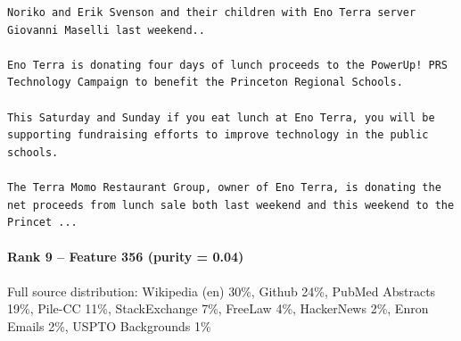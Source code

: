 \begin{verbatim}
Noriko and Erik Svenson and their children with Eno Terra server Giovanni Maselli last weekend..

Eno Terra is donating four days of lunch proceeds to the PowerUp! PRS Technology Campaign to benefit the Princeton Regional Schools.

This Saturday and Sunday if you eat lunch at Eno Terra, you will be supporting fundraising efforts to improve technology in the public schools.

The Terra Momo Restaurant Group, owner of Eno Terra, is donating the net proceeds from lunch sale both last weekend and this weekend to the Princet ...

\end{verbatim}

\paragraph*{Rank 9 -- Feature 356 (purity = 0.04)}

Full source distribution: Wikipedia (en) 30\%, Github 24\%, PubMed Abstracts 19\%, Pile-CC 11\%, StackExchange 7\%, FreeLaw 4\%, HackerNews 2\%, Enron Emails 2\%, USPTO Backgrounds 1\%

